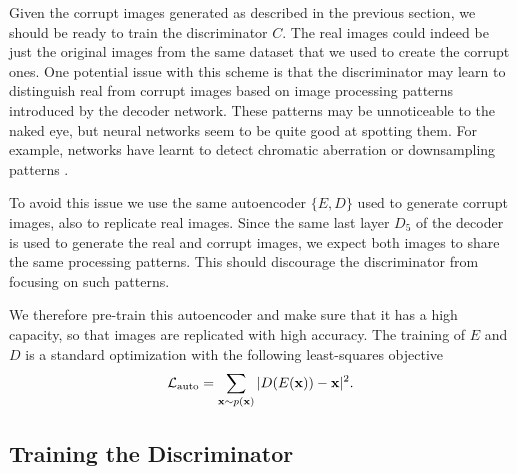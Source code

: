 \documentclass[10pt,twocolumn,letterpaper]{article}
\begin{document}
Given the corrupt images generated as described in the previous section, we should be ready to train the discriminator $C$. The real images could indeed be just the original images from the same dataset that we used to create the corrupt ones. 
One potential issue with this scheme is that the discriminator may learn to distinguish real from corrupt images based on image processing patterns introduced by the decoder network. 
These patterns may be unnoticeable to the naked eye, but neural networks seem to be quite good at spotting them. For example, networks have learnt to detect chromatic aberration \cite{doersch2015unsupervised} or downsampling patterns \cite{noroozi2017representation}. %

To avoid this issue we use the same autoencoder $\{E,D\}$ used to generate corrupt images, also to replicate real images. Since the same last layer $D_5$ of the decoder is used to generate the real and corrupt images, we expect both images to share the same processing patterns. This should discourage the discriminator from focusing on such patterns.

We therefore pre-train this autoencoder and make sure that it has a high capacity, so that images are replicated with high accuracy. The training of $E$ and $D$ is a standard optimization with the following least-squares objective
\begin{align}{\cal L}_\text{auto} = \sum_{\mathbf{x}\sim p(\mathbf{x})}|D(E(\mathbf{x})) - \mathbf{x}|^2.
\end{align}


\subsection{Training the Discriminator}
\label{sec:adv}
\end{document}
